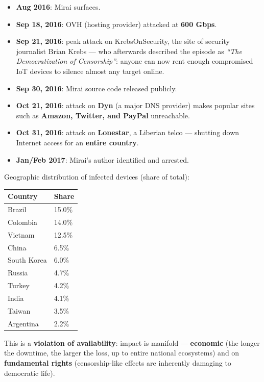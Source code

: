 \documentclass[12pt, a4paper]{article}
\begin{document}
\begin{itemize}
    \item \textbf{Aug 2016}: Mirai surfaces.
    \item \textbf{Sep 18, 2016}: OVH (hosting provider) attacked at \textbf{600 Gbps}.
    \item \textbf{Sep 21, 2016}: peak attack on KrebsOnSecurity, the site of security journalist Brian Krebs — who afterwards described the episode as \emph{``The Democratization of Censorship''}: anyone can now rent enough compromised IoT devices to silence almost any target online.
    \item \textbf{Sep 30, 2016}: Mirai source code released publicly.
    \item \textbf{Oct 21, 2016}: attack on \textbf{Dyn} (a major DNS provider) makes popular sites such as \textbf{Amazon, Twitter, and PayPal} unreachable.
    \item \textbf{Oct 31, 2016}: attack on \textbf{Lonestar}, a Liberian telco — shutting down Internet access for an \textbf{entire country}.
    \item \textbf{Jan/Feb 2017}: Mirai's author identified and arrested.
\end{itemize}

Geographic distribution of infected devices (share of total):
\begin{center}
\begin{tabular}{@{}ll@{}}
\toprule
\textbf{Country} & \textbf{Share} \\
\midrule
Brazil & 15.0\% \\
Colombia & 14.0\% \\
Vietnam & 12.5\% \\
China & 6.5\% \\
South Korea & 6.0\% \\
Russia & 4.7\% \\
Turkey & 4.2\% \\
India & 4.1\% \\
Taiwan & 3.5\% \\
Argentina & 2.2\% \\
\bottomrule
\end{tabular}
\end{center}

This is a \textbf{violation of availability}: impact is manifold — \textbf{economic} (the longer the downtime, the larger the loss, up to entire national ecosystems) and on \textbf{fundamental rights} (censorship-like effects are inherently damaging to democratic life).
\end{document}

